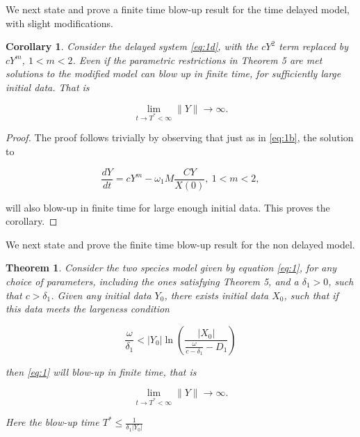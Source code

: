 \documentclass[10pt]{amsart}
\newtheorem{theorem}{Theorem}[section]
\newtheorem{corollary}{Corollary}
\theoremstyle{definition}
\begin{document}
We next state and prove a finite time blow-up result for the time delayed model, with slight modifications.

\begin{corollary}
\label{cor:t11}
Consider the delayed system \eqref{eq:1d}, with the $cY^2$ term replaced by $cY^m$, $1<m<2$. Even if the parametric restrictions in Theorem 5 are met solutions to the modified model can blow up in finite time, for sufficiently large initial data. That is

\begin{equation*}
\lim_{t\rightarrow T^{\ast}<\infty}\| Y \| \rightarrow \infty.
 \end{equation*}

\end{corollary}

\begin{proof}
The proof follows trivially by observing that just as in \eqref{eq:1b}, the solution to

\begin{equation}
\label{eq:1bnn}
\frac{dY}{dt} =   cY^m  - \omega_{1}M\frac{C Y}{X(0)}, \ 1<m<2, 
\end{equation}

will also blow-up in finite time for large enough initial data. This proves the corollary.

\end{proof}

We next state and prove the finite time blow-up result for the non delayed model.

\begin{theorem}
\label{thm:t2}
Consider the two species model given by equation \eqref{eq:1}, for any choice of parameters, including the ones satisfying Theorem 5, and a $\delta_{1} > 0$, such that $c > \delta_{1}$.  Given any initial data $Y_{0}$, there exists initial data $X_{0}$, such that if this data meets the largeness condition

\begin{equation}
\frac{\omega}{\delta_{1}} < |Y_{0}| \ln\left( \frac{|X_{0}|}{\frac{\omega}{c - \delta_{1}} - D_{1}}\right) 
\end{equation}

then \eqref{eq:1} will blow-up in finite time, that is

\begin{equation*}
\lim_{t\rightarrow T^{\ast}<\infty}\| Y \| \rightarrow \infty.
 \end{equation*}

Here the blow-up time $T^{*} \leq \frac{1}{\delta_{1}|Y_{0}|}$ 

\end{theorem}
\end{document}
